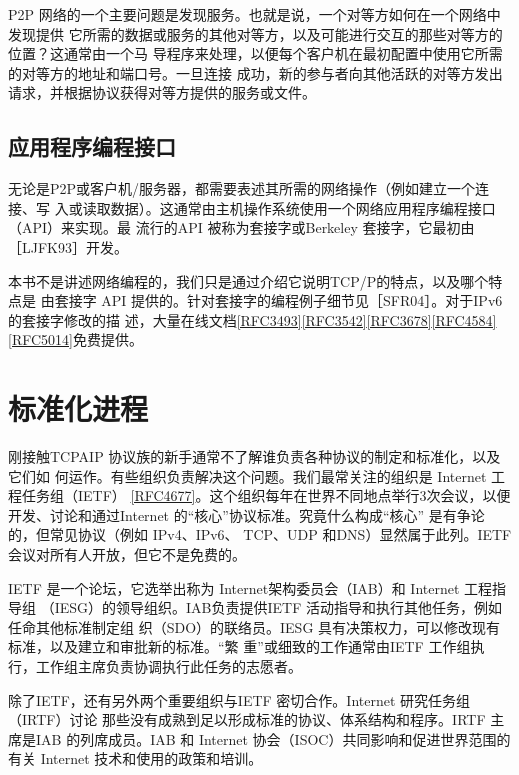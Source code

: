 P2P 网络的一个主要问题是发现服务。也就是说，一个对等方如何在一个网络中发现提供
它所需的数据或服务的其他对等方，以及可能进行交互的那些对等方的位置？这通常由一个马
导程序来处理，以便每个客户机在最初配置中使用它所需的对等方的地址和端口号。一旦连接
成功，新的参与者向其他活跃的对等方发出请求，并根据协议获得对等方提供的服务或文件。

\subsection{应用程序编程接口}
无论是P2P或客户机/服务器，都需要表述其所需的网络操作（例如建立一个连接、写
入或读取数据）。这通常由主机操作系统使用一个网络应用程序编程接口（API）来实现。最
流行的API 被称为套接字或Berkeley 套接字，它最初由［LJFK93］开发。

本书不是讲述网络编程的，我们只是通过介绍它说明TCP/P的特点，以及哪个特点是
由套接字 API 提供的。针对套接字的编程例子细节见［SFR04］。对于IPv6 的套接字修改的描
述，大量在线文档\href{https://www.rfc-editor.org/rfc/rfc3493}{[RFC3493]}\href{https://www.rfc-editor.org/rfc/rfc3542}{[RFC3542]}\href{https://www.rfc-editor.org/rfc/rfc3678}{[RFC3678]}\href{https://www.rfc-editor.org/rfc/rfc4584}{[RFC4584]}\href{https://www.rfc-editor.org/rfc/rfc5014}{[RFC5014]}免费提供。

\section{标准化进程}
刚接触TCPAIP 协议族的新手通常不了解谁负责各种协议的制定和标准化，以及它们如
何运作。有些组织负责解决这个问题。我们最常关注的组织是 Internet 工程任务组（IETF）
\href{https://www.rfc-editor.org/rfc/rfc4677}{[RFC4677]}。这个组织每年在世界不同地点举行3次会议，以便开发、讨论和通过Internet
的“核心”协议标准。究竟什么构成“核心” 是有争论的，但常见协议（例如 IPv4、IPv6、
TCP、UDP 和DNS）显然属于此列。IETF 会议对所有人开放，但它不是免费的。

IETF 是一个论坛，它选举出称为 Internet架构委员会（IAB）和 Internet 工程指导组
（IESG）的领导组织。IAB负责提供IETF 活动指导和执行其他任务，例如任命其他标准制定组
织（SDO）的联络员。IESG 具有决策权力，可以修改现有标准，以及建立和审批新的标准。“繁
重”或细致的工作通常由IETF 工作组执行，工作组主席负责协调执行此任务的志愿者。

除了IETF，还有另外两个重要组织与IETF 密切合作。Internet 研究任务组（IRTF）讨论
那些没有成熟到足以形成标准的协议、体系结构和程序。IRTF 主席是IAB 的列席成员。IAB
和 Internet 协会（ISOC）共同影响和促进世界范围的有关 Internet 技术和使用的政策和培训。

